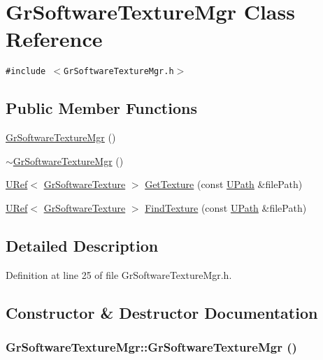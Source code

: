 \hypertarget{class_gr_software_texture_mgr}{
\section{GrSoftwareTextureMgr Class Reference}
\label{class_gr_software_texture_mgr}
}
{\tt \#include $<$GrSoftwareTextureMgr.h$>$}

\subsection*{Public Member Functions}
\begin{CompactItemize}
\item 
\hyperlink{class_gr_software_texture_mgr_3bb030d9c2f5a9f6be1af5b471aadc44}{GrSoftwareTextureMgr} ()
\item 
\hyperlink{class_gr_software_texture_mgr_94d881ba907e54e28c91320965ff8f44}{$\sim$GrSoftwareTextureMgr} ()
\item 
\hyperlink{class_u_ref}{URef}$<$ \hyperlink{class_gr_software_texture}{GrSoftwareTexture} $>$ \hyperlink{class_gr_software_texture_mgr_744b2d59b107ae78eae8e4bfa383c6f7}{GetTexture} (const \hyperlink{class_u_path}{UPath} \&filePath)
\item 
\hyperlink{class_u_ref}{URef}$<$ \hyperlink{class_gr_software_texture}{GrSoftwareTexture} $>$ \hyperlink{class_gr_software_texture_mgr_614dea92c48b69489613a175d1a1b20b}{FindTexture} (const \hyperlink{class_u_path}{UPath} \&filePath)
\end{CompactItemize}


\subsection{Detailed Description}


Definition at line 25 of file GrSoftwareTextureMgr.h.

\subsection{Constructor \& Destructor Documentation}
\hypertarget{class_gr_software_texture_mgr_3bb030d9c2f5a9f6be1af5b471aadc44}{
\subsubsection[{GrSoftwareTextureMgr}]{\setlength{\rightskip}{0pt plus 5cm}GrSoftwareTextureMgr::GrSoftwareTextureMgr ()}}
\label{class_gr_software_texture_mgr_3bb030d9c2f5a9f6be1af5b471aadc44}





